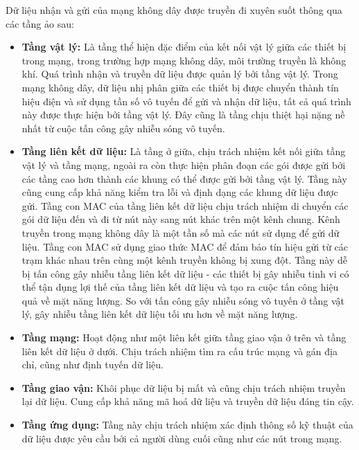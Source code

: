 \documentclass{uetgraduation}
\begin{document}
Dữ liệu nhận và gửi của mạng không dây được truyền đi xuyên suốt thông qua các tầng ảo sau:
\begin{itemize}
    \item \textbf{Tầng vật lý:} Là tầng thể hiện đặc điểm của kết nối vật lý giữa các thiết bị trong mạng, trong trường hợp mạng không dây, môi trường truyền
    là không khí. Quá trình nhận và truyền dữ liệu được quản lý bởi tầng vật lý. Trong mạng không dây, dữ liệu nhị phân giữa các thiết bị được chuyển
    thành tín hiệu điện và sử dụng tần số vô tuyến để gửi và nhận dữ liệu, tất cả quá trình này được thực hiện bởi tầng vật lý. Đây cũng là tầng chịu
    thiệt hại nặng nề nhất từ cuộc tấn công gây nhiễu sóng vô tuyến.
    \item \textbf{Tầng liên kết dữ liệu:} Là tầng ở giữa, chịu trách nhiệm kết nối giữa tầng vật lý và tầng mạng, ngoài ra còn thực hiện phân đoạn các gói được
    gửi bởi các tầng cao hơn thành các khung có thể được gửi bởi tầng vật lý. Tầng này cũng cung cấp khả năng kiểm tra lỗi và định dạng các khung dữ liệu
    được gửi. Tầng con MAC của tầng liên kết dữ liệu chịu trách nhiệm di chuyển các gói dữ liệu đến và đi từ nút này sang nút khác trên một kênh chung.
    Kênh truyền trong mạng không dây là một tần số mà các nút sử dụng để gửi dữ liệu. Tầng con MAC sử dụng giao thức MAC để đảm bảo tín hiệu gửi từ các
    trạm khác nhau trên cùng một kênh truyền không bị xung đột. Tầng này dễ bị tấn công gây nhiễu tầng liên kết dữ liệu - các thiết bị gây nhiễu tinh vi
    có thể tận dụng lợi thế của tầng liên kết dữ liệu và tạo ra cuộc tấn công hiệu quả về mặt năng lượng. So với tấn công gây nhiễu sóng vô tuyến ở tầng
    vật lý, gây nhiễu tầng liên kết dữ liệu tối ưu hơn về mặt năng lượng.
    \item \textbf{Tầng mạng:} Hoạt động như một liên kết giữa tầng giao vận ở trên và tầng liên kết dữ liệu ở dưới. Chịu trách nhiệm tìm ra cấu trúc mạng và gán địa
    chỉ, cũng như định tuyến dữ liệu.
    \item \textbf{Tầng giao vận:} Khôi phục dữ liệu bị mất và cũng chịu trách nhiệm truyền lại dữ liệu. Cung cấp khả năng mã hoá dữ liệu và truyền dữ liệu đáng tin cậy.
    \item \textbf{Tầng ứng dụng:} Tầng này chịu trách nhiệm xác định thông số kỹ thuật của dữ liệu được yêu cầu bởi cả người dùng cuối cũng như các nút trong mạng. 
\end{itemize}
\end{document}
